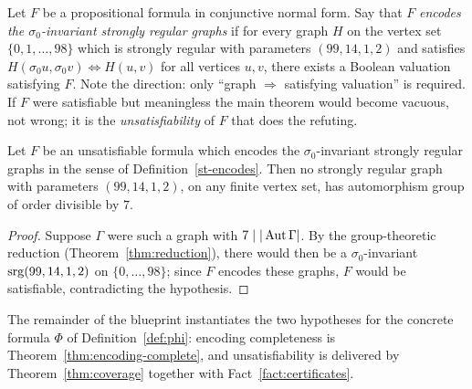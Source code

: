 \begin{definition}\label{st-encodes}
Let $F$ be a propositional formula in conjunctive normal form.  Say that $F$
\emph{encodes the $\sigma_0$-invariant strongly regular graphs} if for every
graph $H$ on the vertex set $\{0,1,\dots,98\}$ which is strongly regular with
parameters $(99,14,1,2)$ and satisfies
$H(\sigma_0 u,\sigma_0 v) \Leftrightarrow H(u,v)$ for all vertices $u,v$,
there exists a Boolean valuation satisfying $F$.  Note the direction: only
``graph $\Rightarrow$ satisfying valuation'' is required.  If $F$ were
satisfiable but meaningless the main theorem would become vacuous, not
wrong; it is the \emph{unsatisfiability} of $F$ that does the refuting.
\leanok
{}
\end{definition}

\begin{theorem}\label{st-conditional}
Let $F$ be an unsatisfiable formula which encodes the $\sigma_0$-invariant
strongly regular graphs in the sense of Definition~\ref{st-encodes}.  Then
no strongly regular graph with parameters $(99,14,1,2)$, on any finite
vertex set, has automorphism group of order divisible by $7$.
\leanok
{}
\end{theorem}

\begin{proof}
Suppose $\Gamma$ were such a graph with $7 \mid |\operatorname{Aut}\Gamma|$.  By the group-theoretic
reduction (Theorem~\ref{thm:reduction}), there would then be a
$\sigma_0$-invariant $\mathrm{srg}(99,14,1,2)$ on $\{0,\dots,98\}$; since $F$ encodes
these graphs, $F$ would be satisfiable, contradicting the hypothesis.
\end{proof}

The remainder of the blueprint instantiates the two hypotheses for the
concrete formula $\Phi$ of Definition~\ref{def:phi}: encoding completeness
is Theorem~\ref{thm:encoding-complete}, and unsatisfiability is delivered by
Theorem~\ref{thm:coverage} together with Fact~\ref{fact:certificates}.

